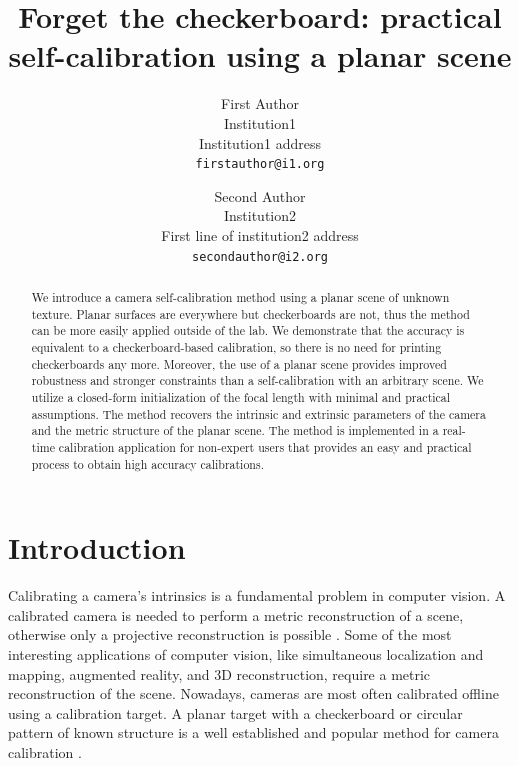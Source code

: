 \documentclass[10pt,twocolumn,letterpaper]{article}
\begin{document}
\title{Forget the checkerboard: practical self-calibration using a planar scene}

\author{First Author\\
Institution1\\
Institution1 address\\
{\tt\small firstauthor@i1.org}
\and
Second Author\\
Institution2\\
First line of institution2 address\\
{\tt\small secondauthor@i2.org}
}

\maketitle


\begin{abstract}
We introduce a camera self-calibration method using a planar scene of unknown texture. Planar surfaces are everywhere but checkerboards are not, thus the method can be more easily applied outside of the lab. We demonstrate that the accuracy is equivalent to a checkerboard-based calibration, so there is no need for printing checkerboards any more. Moreover, the use of a planar scene provides improved robustness and stronger constraints than a self-calibration with an arbitrary scene. We utilize a closed-form initialization of the focal length with minimal and practical assumptions. The method recovers the intrinsic and extrinsic parameters of the camera and the metric structure of the planar scene. The method is implemented in a real-time calibration application for non-expert users that provides an easy and practical process to obtain high accuracy calibrations. 
\end{abstract}

\section{Introduction}

Calibrating a camera's intrinsics is a fundamental problem in computer vision. A calibrated camera is needed to perform a metric reconstruction of a scene, otherwise only a projective reconstruction is possible \cite{hartley2003}. Some of the most interesting applications of computer vision, like simultaneous localization and mapping, augmented reality, and 3D reconstruction, require a metric reconstruction of the scene. Nowadays, cameras are most often calibrated offline using a calibration target. A planar target with a checkerboard or circular pattern of known structure is a well established and popular method for camera calibration \cite{zhang1999,bouguetMCT,kannala2008}.
\end{document}
